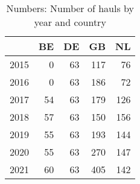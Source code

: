 \begin{table}[ht]
\centering
\begin{tabular}{rrrrr}
  \hline
 & BE & DE & GB & NL \\ 
  \hline
2015 & 0 & 63 & 117 & 76 \\ 
  2016 & 0 & 63 & 186 & 72 \\ 
  2017 & 54 & 63 & 179 & 126 \\ 
  2018 & 57 & 63 & 150 & 156 \\ 
  2019 & 55 & 63 & 193 & 144 \\ 
  2020 & 55 & 63 & 270 & 147 \\ 
  2021 & 60 & 63 & 405 & 142 \\ 
   \hline
\end{tabular}
\caption{Numbers: Number of hauls by year and country} 
\end{table}
